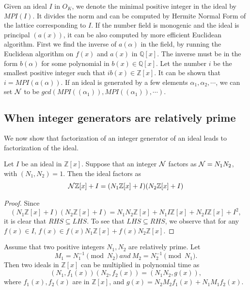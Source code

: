 \documentclass[runningheads, letter]{llncs}
\newcommand{\Z}{{\mathbb Z}}
\newcommand{\Q}{{\mathbb Q}}
\begin{document}
Given an ideal \( I \) in \( O_K \), we denote the
minimal positive integer in the ideal by \( MPI(I) \).
It divides the norm and can be computed by
Hermite Normal Form of the lattice corresponding to
\( I \). If the number field is monogenic and
the ideal is principal \( (a(x)) \), it can
be also computed by more efficient Euclidean algorithm. 
First we find the inverse of \( a(\alpha) \) in the field,
by running the Euclidean algorithm on \( f(x) \) and \( a(x) \)
in \( \Q[x] \). The inverse must be in the form
\( b(\alpha) \) for some polynomial in \( b(x) \in \Q[x] \).
Let the number \( i\) be the smallest positive integer
such that \( i b(x) \in \Z[x] \).
It can be shown that \( i =  MPI (a(\alpha))  \).
If an ideal is generated by a few elements \( \alpha_1,
\alpha_2, \cdots\), we can set \({\cal N} \) to be
\( gcd(MPI((\alpha_1)), MPI((\alpha_1)), \cdots) \).
%
%
%

%
%
%
%
%
%
%

\subsection{When integer generators are relatively prime}

We now show that factorization of an integer
generator of an ideal leads to factorization of the ideal.

\begin{lemma} \label{lem:factorideal}
  Let \( I \) be an ideal in \( \Z[x] \). Suppose that
  an integer \( {\cal N} \) factors as \( {\cal N} = N_1 N_2 \),
  with \( (N_1, N_2) = 1 \). Then the ideal factors as 
  \[ {\cal N} \Z[x] + I = (N_1 \Z[x]+ I) (N_2 \Z[x] + I)  \] 
\end{lemma}

\begin{proof}
  Since 
  \[  (N_1 \Z[x]+ I) (N_2 \Z[x] + I) = N_1 N_2\Z[x]
  + N_1 I \Z[x] + N_2 I \Z[x] + I^2, \]
it is clear that \(  RHS \subseteq LHS \).
   To see that
  \( LHS \subseteq RHS \), we observe
  that for any \( f(x) \in I \),
  \( f(x) \in f(x) N_1 \Z[x] + f(x) N_2 \Z[x] \). 
\end{proof}

\begin{lemma}
\label{lem:relativeprime}
  Assume that two positive integers \( N_1, N_2 \)
  are relatively prime. Let
  \[ M_1 =  N_1^{-1} \pmod{N_2 }\ and
  \ M_2 =  N_2^{-1} \pmod{N_1 }.\]
Then two ideals in \( \Z[x] \) can be multiplied
in polynomial time as
  \[ (N_1, f_1(x)) (N_2, f_2(x)) = (N_1 N_2, g(x) ), \]
  where \( f_1(x), f_2(x) \) are in \( \Z[x] \), and 
  \( g(x) = N_2 M_2 f_1(x) + N_1 M_1 f_2(x) \).
\end{lemma}
\end{document}
